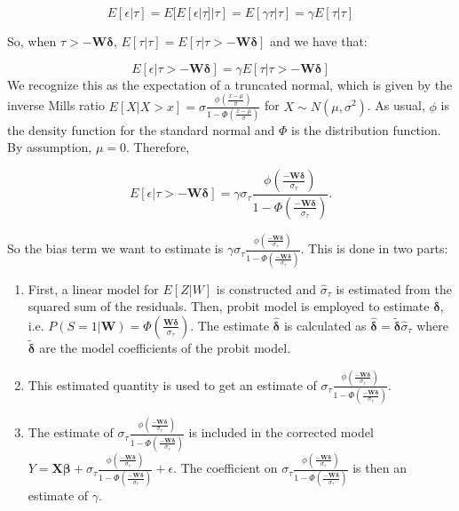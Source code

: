 \documentclass[12pt,twoside]{reedthesis}
\theoremstyle{definition}
\begin{document}
$$E[\epsilon | \tau] = E[E[\epsilon | \tau] | \tau] = E[\gamma \tau | \tau] = \gamma E[\tau | \tau]$$	

So, when $\tau > - \mathbf{W} \boldsymbol{\delta}$, $E[\tau | \tau] = E[\tau | \tau > - \mathbf{W} \boldsymbol{\delta}]$ and we have that:

$$E[\epsilon | \tau >  - \mathbf{W} \boldsymbol{\delta}]  = \gamma E[ \tau | \tau >   - \mathbf{W} \boldsymbol{\delta}]$$																																																												
We recognize this as the expectation of a truncated normal, which is given by the inverse Mills ratio $E[X | X > x] = \sigma \frac{\phi(\frac{x- \mu}{\sigma})}{1 - \Phi(\frac{x - \mu}{\sigma})}$ for $X \sim N(\mu, \sigma^2)$. As usual, $\phi$ is the density function for the standard normal and $\Phi$ is the distribution function. By assumption, $\mu = 0$. Therefore,						

$$E[\epsilon | \tau > -\mathbf{W} \boldsymbol{\delta}] = \gamma \sigma_{\tau}\frac{\phi(\frac{-\mathbf{W} \boldsymbol{\delta}}{\sigma_\tau})}{1 - \Phi(\frac{-\mathbf{W} \boldsymbol{\delta}}{\sigma_\tau})}.$$				

So the bias term  we want to estimate is $\gamma\sigma_{\tau}\frac{\phi(\frac{-\mathbf{W} \boldsymbol{\delta}}{\sigma_\tau})}{1 - \Phi(\frac{-\mathbf{W} \boldsymbol{\delta}}{\sigma_\tau})}$. This is done in two parts:

\begin{enumerate}
\item First, a linear model for $E[Z | W]$ is constructed and $\hat \sigma_{\tau}$ is estimated from the squared sum of the residuals. Then, probit model is employed to estimate $\boldsymbol{\delta}$, i.e. $P(S = 1 | \mathbf{W}) = \Phi(\frac{ \mathbf{W} \boldsymbol{\delta}}{\sigma_{\tau}})$. The estimate $\boldsymbol{\hat \delta}$ is calculated as $\boldsymbol{\hat \delta} = \boldsymbol{\tilde{\delta}} \hat \sigma_{\tau}$ where $\boldsymbol{\tilde{\delta}}$ are the model coefficients of the probit model.

\item This estimated quantity is used to get an estimate of  $\sigma_{\tau}\frac{\phi(\frac{-\mathbf{W} \boldsymbol{\delta}}{\sigma_\tau})}{1 - \Phi(\frac{-\mathbf{W} \boldsymbol{\delta}}{\sigma_\tau})}$.

\item The estimate of $\sigma_{\tau}\frac{\phi(\frac{-\mathbf{W} \boldsymbol{\delta}}{\sigma_\tau})}{1 - \Phi(\frac{-\mathbf{W} \boldsymbol{\delta}}{\sigma_\tau})}$ is included in the corrected model $Y = \mathbf{X} \boldsymbol{\beta} + \sigma_{\tau}\frac{\phi(\frac{-\mathbf{W} \boldsymbol{\delta}}{\sigma_\tau})}{1 - \Phi(\frac{-\mathbf{W} \boldsymbol{\delta}}{\sigma_\tau})} + \epsilon$. The coefficient on $\sigma_{\tau}\frac{\phi(\frac{-\mathbf{W} \boldsymbol{\delta}}{\sigma_\tau})}{1 - \Phi(\frac{-\mathbf{W} \boldsymbol{\delta}}{\sigma_\tau})}$ is then an estimate of $\gamma$. 
\end{enumerate}
						
\end{document}
